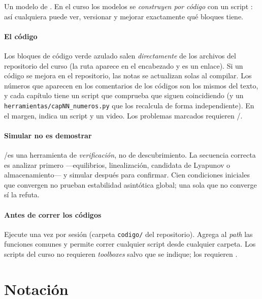\begin{modelo}
Un modelo de \simulink. En el curso los modelos se \emph{construyen por código} con un script : así cualquiera puede ver, versionar y mejorar exactamente qué bloques tiene.
\end{modelo}

\paragraph{El código}
Los bloques de código verde azulado salen \emph{directamente} de los archivos del repositorio del curso (la ruta aparece en el encabezado y es un enlace). Si un código se mejora en el repositorio, las notas se actualizan solas al compilar. Los números que aparecen en los comentarios de los códigos son los mismos del texto, y cada capítulo tiene un script  que comprueba que siguen coincidiendo (y un \texttt{herramientas/capNN\_numeros.py} que los recalcula de forma independiente). En el margen, \textcolor{snlteal}{\faFileCode} indica un script y \textcolor{snlcoral}{\faPlayCircle} un video. Los problemas marcados \etiquetaM{} requieren \matlab/\simulink.

\paragraph{Simular no es demostrar}
\matlab/\simulink es una herramienta de \emph{verificación}, no de descubrimiento. La secuencia correcta es analizar primero ---equilibrios, linealización, candidata de Lyapunov o almacenamiento--- y simular después para confirmar. Cien condiciones iniciales que convergen no prueban estabilidad asintótica global; una sola que no converge sí la refuta.

\paragraph{Antes de correr los códigos}
Ejecute una vez por sesión  (carpeta \texttt{codigo/} del repositorio). Agrega al \emph{path} las funciones comunes y permite correr cualquier script desde cualquier carpeta. Los scripts del curso no requieren \emph{toolboxes} salvo que se indique; los  requieren \simulink.

\section*{Notación}

